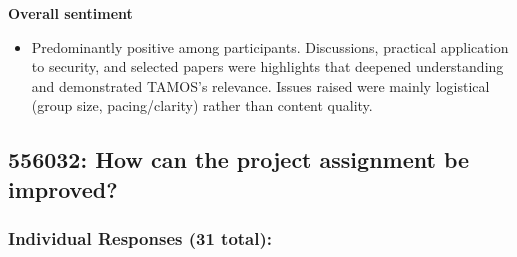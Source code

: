 \documentclass[a4paper]{report}
\begin{document}
\textbf{Overall sentiment}
\begin{itemize}
\item Predominantly positive among participants. Discussions, practical application to security, and selected papers were highlights that deepened understanding and demonstrated TAMOS’s relevance. Issues raised were mainly logistical (group size, pacing/clarity) rather than content quality.
\end{itemize}

\subsection{556032: How can the project assignment be improved?}

\subsubsection{Individual Responses (31 total):}
\end{document}
